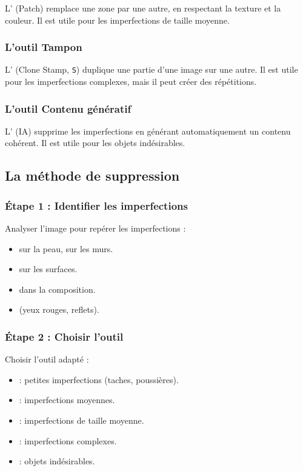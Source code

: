 L' (Patch) remplace une zone par une autre, en respectant la texture et la couleur. Il est utile pour les imperfections de taille moyenne.

\subsubsection{L'outil Tampon}

L' (Clone Stamp, \texttt{S}) duplique une partie d'une image sur une autre. Il est utile pour les imperfections complexes, mais il peut créer des répétitions.

\subsubsection{L'outil Contenu génératif}

L' (IA) supprime les imperfections en générant automatiquement un contenu cohérent. Il est utile pour les objets indésirables.

\subsection{La méthode de suppression}

\subsubsection{Étape 1 : Identifier les imperfections}

Analyser l'image pour repérer les imperfections :

\begin{itemize}
    \item {} sur la peau, sur les murs.
    \item {} sur les surfaces.
    \item {} dans la composition.
    \item {} (yeux rouges, reflets).
\end{itemize}

\subsubsection{Étape 2 : Choisir l'outil}

Choisir l'outil adapté :

\begin{itemize}
    \item {} : petites imperfections (taches, poussières).
    \item {} : imperfections moyennes.
    \item {} : imperfections de taille moyenne.
    \item {} : imperfections complexes.
    \item {} : objets indésirables.
\end{itemize}

